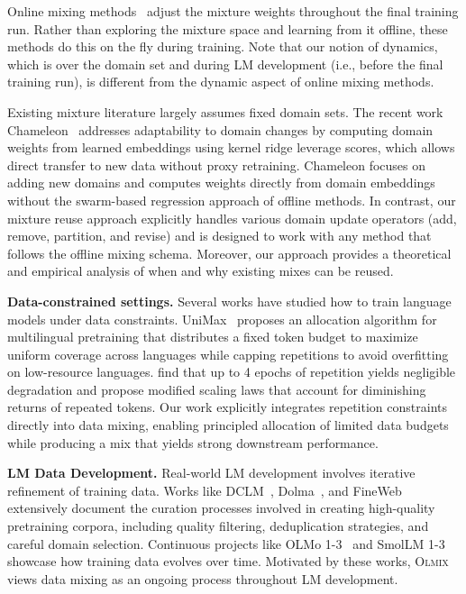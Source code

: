 \documentclass[table]{ai2style/ai2}
\newcommand{\olmix}{\textsc{Olmix}\xspace}
\begin{document}
Online mixing methods~\citep{chen2023skillitdatadrivenskillsframework, jiang2024adaptivedataoptimizationdynamic, albalak2023efficientonlinedatamixing} adjust the mixture weights throughout the final training run. Rather than exploring the mixture space and learning from it offline, these methods do this on the fly during training. Note that our notion of dynamics, which is over the domain set and during LM development (i.e., before the final training run), is different from the dynamic aspect of online mixing methods.

Existing mixture literature largely assumes fixed domain sets. The recent work Chameleon~\citep{xie2025chameleonflexibledatamixingframework} addresses adaptability to domain changes by computing domain weights from learned embeddings using kernel ridge leverage scores, which allows direct transfer to new data without proxy retraining. Chameleon focuses on adding new domains and computes weights directly from domain embeddings without the swarm-based regression approach of offline methods. In contrast, our mixture reuse approach explicitly handles various domain update operators (add, remove, partition, and revise) and is designed to work with any method that follows the offline mixing schema. Moreover, our approach provides a theoretical and empirical analysis of when and why existing mixes can be reused.

\textbf{Data-constrained settings.} Several works have studied how to train language models under data constraints. UniMax~\citep{chung2023unimaxfairereffectivelanguage} proposes an allocation algorithm for multilingual pretraining that distributes a fixed token budget to maximize uniform coverage across languages while capping repetitions to avoid overfitting on low-resource languages. \citet{muennighoff2025scalingdataconstrainedlanguagemodels} find that up to 4 epochs of repetition yields negligible degradation and propose modified scaling laws that account for diminishing returns of repeated tokens. Our work explicitly integrates repetition constraints directly into data mixing, enabling principled allocation of limited data budgets while producing a mix that yields strong downstream performance.

\textbf{LM Data Development.} Real-world LM development involves iterative refinement of training data. Works like DCLM~\citep{dclm}, Dolma~\citep{soldaini2024dolma}, and FineWeb~\citep{penedo2024fineweb} extensively document the curation processes involved in creating high-quality pretraining corpora, including quality filtering, deduplication strategies, and careful domain selection. Continuous projects like OLMo 1-3~\citep{Groeneveld2024OLMoAT, olmo20242olmo2furious, olmo2025olmo3} and SmolLM 1-3~\citep{allal2024smollm, allal2025smollm2smolgoesbig, bakouch2025smollm3} showcase how training data evolves over time. Motivated by these works, \olmix views data mixing as an ongoing process throughout LM development.
\end{document}
